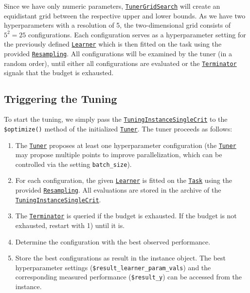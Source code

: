 \documentclass[
]{scrbook}
\providecommand{\tightlist}{%
  \setlength{\itemsep}{0pt}\setlength{\parskip}{0pt}}
\begin{document}
Since we have only numeric parameters, \href{https://mlr3tuning.mlr-org.com/reference/mlr_tuners_grid_search.html}{\texttt{TunerGridSearch}} will create an equidistant grid between the respective upper and lower bounds.
As we have two hyperparameters with a resolution of 5, the two-dimensional grid consists of \(5^2 = 25\) configurations.
Each configuration serves as a hyperparameter setting for the previously defined \href{https://mlr3.mlr-org.com/reference/Learner.html}{\texttt{Learner}} which is then fitted on the task using the provided \href{https://mlr3.mlr-org.com/reference/Resampling.html}{\texttt{Resampling}}.
All configurations will be examined by the tuner (in a random order), until either all configurations are evaluated or the \href{https://bbotk.mlr-org.com/reference/Terminator.html}{\texttt{Terminator}} signals that the budget is exhausted.

\hypertarget{tuning-triggering}{%
\subsection{Triggering the Tuning}\label{tuning-triggering}}

To start the tuning, we simply pass the \href{https://mlr3tuning.mlr-org.com/reference/TuningInstanceSingleCrit.html}{\texttt{TuningInstanceSingleCrit}} to the \texttt{\$optimize()} method of the initialized \href{https://mlr3tuning.mlr-org.com/reference/Tuner.html}{\texttt{Tuner}}.
The tuner proceeds as follows:

\begin{enumerate}
\def\labelenumi{\arabic{enumi}.}
\tightlist
\item
  The \href{https://mlr3tuning.mlr-org.com/reference/Tuner.html}{\texttt{Tuner}} proposes at least one hyperparameter configuration (the \href{https://mlr3tuning.mlr-org.com/reference/Tuner.html}{\texttt{Tuner}} may propose multiple points to improve parallelization, which can be controlled via the setting \texttt{batch\_size}).
\item
  For each configuration, the given \href{https://mlr3.mlr-org.com/reference/Learner.html}{\texttt{Learner}} is fitted on the \href{https://mlr3.mlr-org.com/reference/Task.html}{\texttt{Task}} using the provided \href{https://mlr3.mlr-org.com/reference/Resampling.html}{\texttt{Resampling}}.
  All evaluations are stored in the archive of the \href{https://mlr3tuning.mlr-org.com/reference/TuningInstanceSingleCrit.html}{\texttt{TuningInstanceSingleCrit}}.
\item
  The \href{https://bbotk.mlr-org.com/reference/Terminator.html}{\texttt{Terminator}} is queried if the budget is exhausted.
  If the budget is not exhausted, restart with 1) until it is.
\item
  Determine the configuration with the best observed performance.
\item
  Store the best configurations as result in the instance object.
  The best hyperparameter settings (\texttt{\$result\_learner\_param\_vals}) and the corresponding measured performance (\texttt{\$result\_y}) can be accessed from the instance.
\end{enumerate}
\end{document}
